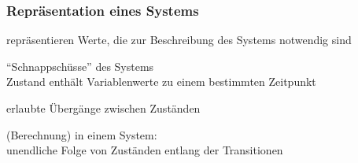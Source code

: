     \begin{frame}
      \frametitle{Repräsentation eines Systems}

      \begin{Itemize}
        \item
           repräsentieren Werte, die zur Beschreibung des Systems notwendig sind
        \item
           "`Schnappschüsse"' des Systems\\
          Zustand enthält Variablenwerte zu einem bestimmten Zeitpunkt
        \item
           erlaubte Übergänge zwischen Zuständen
      \end{Itemize}

      \par\bigskip
         (Berechnung) in einem System:\\
        unendliche Folge von Zuständen entlang der Transitionen

    \end{frame}


